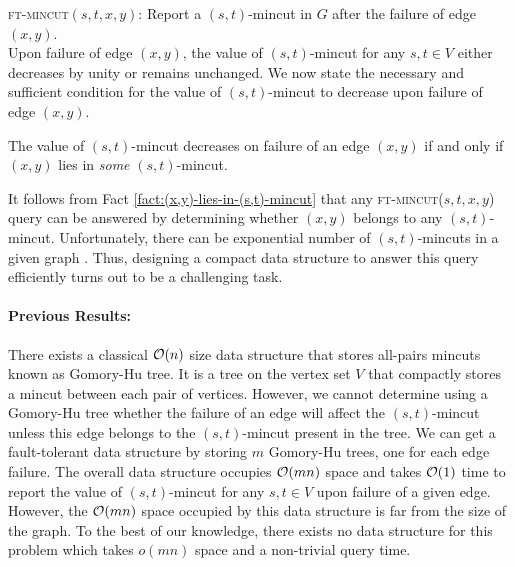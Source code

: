 
\noindent
{\textsc{ft-mincut}}$(s,t,x,y)$: Report a $(s,t)$-mincut in $G$ after the failure of edge $(x,y)$.\\


Upon failure of edge $(x,y)$, the value of $(s,t)$-mincut for any $s,t\in V$ either decreases by unity or remains unchanged. We now state the necessary and sufficient condition for the value of $(s,t)$-mincut to decrease upon failure of edge $(x,y)$.

\begin{fact}
\label{fact:(x,y)-lies-in-(s,t)-mincut}
The value of $(s,t)$-mincut decreases on failure of an edge $(x,y)$ if and only if $(x,y)$ lies in \textit{some} $(s,t)$-mincut.
\end{fact}

It follows from Fact \ref{fact:(x,y)-lies-in-(s,t)-mincut} that any {\textsc{ft-mincut}}($s,t,x,y$) query can be answered by determining whether $(x,y)$ belongs to any $(s,t)$-mincut. Unfortunately, there can be exponential number of $(s,t)$-mincuts in a given graph \cite{DBLP:journals/mp/PicardQ82}. Thus, designing a compact data structure to answer this query efficiently turns out to be a challenging task.

\paragraph{Previous Results:} 


There exists a classical ${\cal O}(n)$ size data structure that stores all-pairs mincuts \cite{GH61} known as Gomory-Hu tree. It is a tree on the vertex set $V$ that compactly stores a mincut between each pair of vertices. However, we cannot determine using a Gomory-Hu tree whether the failure of an edge will affect the $(s,t)$-mincut unless this edge belongs to the $(s,t)$-mincut present in the tree. We can get a fault-tolerant data structure by storing $m$ Gomory-Hu trees, one for each edge failure. The overall data structure occupies ${\cal O}(mn)$ space and takes ${\cal O}(1)$ time to report the value of $(s,t)$-mincut for any $s,t\in V$ upon failure of a given edge. However, the ${\cal O}(mn)$ space occupied by this data structure is far from the size of the graph. To the best of our knowledge, there exists no data structure for this problem which takes $o(mn)$ space and a non-trivial query time.



